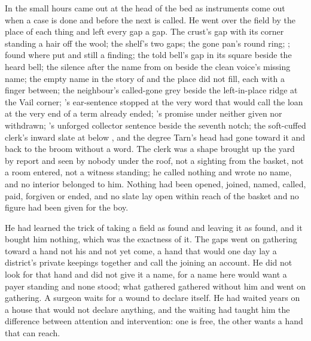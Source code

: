 \scenebreak

In the small hours  came out at the head of the bed as instruments come out when a case is done and before the next is called. He went over the field by the place of each thing and left every gap a gap. The crust's gap with its corner standing a hair off the wool; the shelf's two gaps; the gone pan's round ring; ;  found where put and still a finding; the told bell's gap in its square beside the heard bell; the silence after the name from  on  beside the clean voice's missing name; the empty name in the story of  and the place  did not fill, each with a finger between; the neighbour's called-gone grey beside the left-in-place ridge at the Vail corner; 's ear-sentence stopped at the very word that would call the loan at the very end of a term already ended; 's promise under  neither given nor withdrawn; 's unforged collector sentence beside the seventh notch; the soft-cuffed clerk's inward slate at  below , and the degree Tarn's head had gone toward it and back to the broom without a word. The clerk was a shape brought up the yard by report and seen by nobody under the roof, not a sighting from the basket, not a room entered, not a witness standing; he called nothing and wrote no name, and no interior belonged to him. Nothing had been opened, joined, named, called, paid, forgiven or ended, and no slate lay open within reach of the basket and no figure had been given for the boy.

He had learned the trick of taking a field as found and leaving it as found, and it bought him nothing, which was the exactness of it. The gaps went on gathering toward a hand not his and not yet come, a hand that would one day lay a district's private keepings together and call the joining an account. He did not look for that hand and did not give it a name, for a name here would want a payer standing and none stood; what gathered gathered without him and went on gathering. A surgeon waits for a wound to declare itself. He had waited years on a house that would not declare anything, and the waiting had taught him the difference between attention and intervention: one is free, the other wants a hand that can reach.

